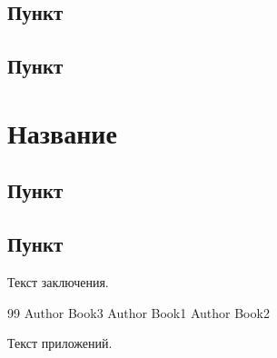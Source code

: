 \documentclass[14pt, a4paper]{extarticle}
\begin{document}
\subsection{Пункт}
\subsection{Пункт}

\newpage
\section{Название}
\subsection{Пункт}
\subsection{Пункт}

\newpage
\conclusion

Текст заключения.

\newpage
\centeredrefname
\clearpage
{}
\begin{thebibliography}{99}
 Author Book3
 Author Book1
 Author Book2
\end{thebibliography}

\newpage
\applications

Текст приложений.
\end{document}
